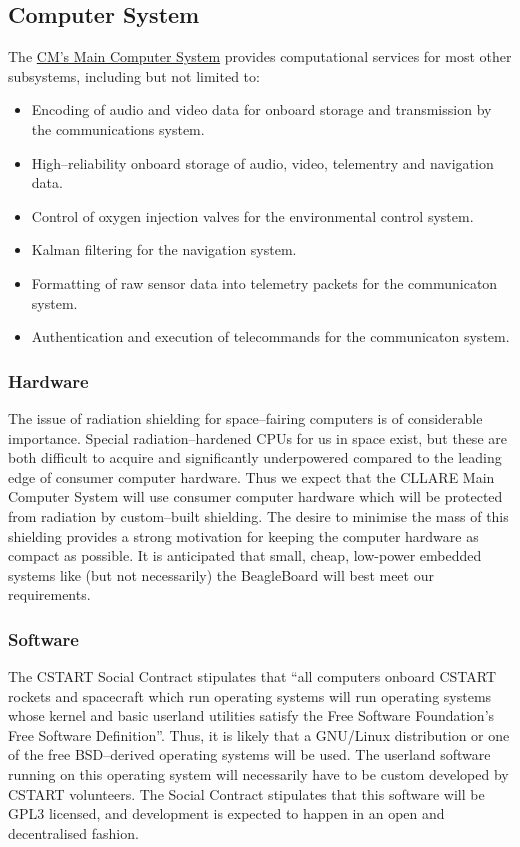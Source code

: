 \documentclass{report}
\begin{document}
\subsection{Computer System}

The \href{http://cstart.org/wiki/CLLARE_Main_Computer_System}{CM's Main Computer System} provides computational services for most other subsystems, including but not limited to:
\begin{itemize}
\item Encoding of audio and video data for onboard storage and transmission by the communications system.
\item High--reliability onboard storage of audio, video, telementry and navigation data.
\item Control of oxygen injection valves for the environmental control system.
\item Kalman filtering for the navigation system.
\item Formatting of raw sensor data into telemetry packets for the communicaton system.
\item Authentication and execution of telecommands for the communicaton system.
\end{itemize}

\subsubsection{Hardware}

The issue of radiation shielding for space--fairing computers is of considerable importance.  Special radiation--hardened CPUs for us in space exist, but these are both difficult to acquire and significantly underpowered compared to the leading edge of consumer computer hardware.  Thus we expect that the CLLARE Main Computer System will use consumer computer hardware which will be protected from radiation by custom--built shielding.  The desire to minimise the mass of this shielding provides a strong motivation for keeping the computer hardware as compact as possible.  It is anticipated that small, cheap, low-power embedded systems like (but not necessarily) the BeagleBoard will best meet our requirements.

\subsubsection{Software}

The CSTART Social Contract stipulates that ``all computers onboard CSTART rockets and spacecraft which run operating systems will run operating systems whose kernel and basic userland utilities satisfy the Free Software Foundation's Free Software Definition''.  Thus, it is likely that a GNU/Linux distribution or one of the free BSD--derived operating systems will be used.  The userland software running on this operating system will necessarily have to be custom developed by CSTART volunteers.  The Social Contract stipulates that this software will be GPL3 licensed, and development is expected to happen in an open and decentralised fashion.
\end{document}
